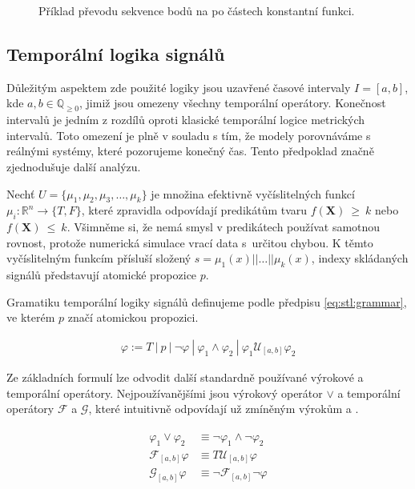 \begin{figure}[h!]
\begin{center}
\end{center}
\caption{Příklad převodu sekvence bodů na po částech konstantní funkci.}
\end{figure}

\subsection{Temporální logika signálů}\label{section:stl}
Důležitým aspektem zde použité logiky jsou uzavřené časové intervaly $I = [a, b]$, kde $a, b \in \mathbb{Q}_{\geq0}$,
jimiž jsou omezeny všechny temporální operátory. Konečnost intervalů je jedním z rozdílů
oproti klasické temporální logice metrických intervalů. Toto omezení je plně v souladu s tím,
že modely porovnáváme s reálnými systémy, které pozorujeme konečný čas. Tento předpoklad značně
zjedno\-du\-šuje další analýzu.

Nechť $U = \{\mu_1, \mu_2, \mu_3, \ldots, \mu_k\}$ je množina efektivně vyčíslitelných funk\-cí
$\mu_i: \mathbb{R}^n \rightarrow \{T, F\}$, které zpravidla odpovídají predikátům tvaru
$f(\mathbf{X})~\geq~k$ nebo $f(\mathbf{X})~\leq~k$. Všimněme si, že nemá smysl v predikátech
používat samotnou rovnost, protože numerická simulace vrací data s~určitou chybou.
K těmto vyčíslitelným funkcím přísluší složený $s = \mu_1(x)|| \ldots|| \mu_k(x)$,
indexy skládaných signálů představují atomické propozice $p$.

Gramatiku temporální logiky signálů definujeme podle předpisu \ref{eq:stl:grammar},
ve kterém $p$ značí atomickou propozici.

\begin{align}\label{eq:stl:grammar}
\varphi := T~|~p~|~\neg\varphi~|~\varphi_1 \wedge \varphi_2~|~\varphi_1\mathcal{U}_{[a,b]}\varphi_2
\end{align}

Ze základních formulí lze odvodit další standardně používané výrokové a temporální operátory.
Nejpoužívanějšími jsou výrokový operátor $\vee$ a temporální operátory $\mathcal{F}$ a $\mathcal{G}$,
které intuitivně odpovídají už zmíněným výrokům  a .

\begin{align}\label{eq:stl:other}
\begin{array}{ll}
\varphi_1\vee\varphi_2 		&\equiv \neg\varphi_1 \wedge \neg\varphi_2		\\
\mathcal{F}_{[a,b]}\varphi 	&\equiv T\mathcal{U}_{[a,b]}\varphi				\\
\mathcal{G}_{[a,b]}\varphi 	&\equiv \neg\mathcal{F}_{[a,b]}\neg\varphi		\\
\end{array}
\end{align}

